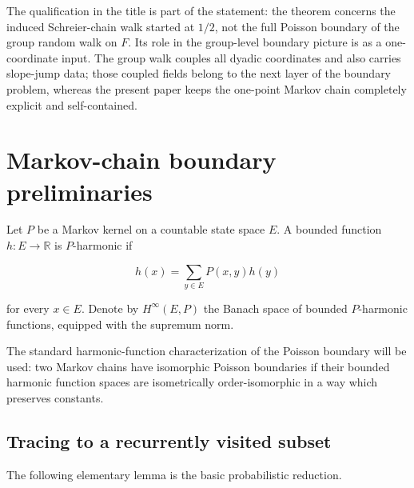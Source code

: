 \documentclass[11pt,a4paper]{scrartcl}
\begin{document}
The qualification in the title is part of the statement: the theorem concerns
the induced Schreier-chain walk started at \(1/2\), not the full Poisson
boundary of the group random walk on \(F\).  Its role in the group-level
boundary picture is as a one-coordinate input.  The group walk couples all
dyadic coordinates and also carries slope-jump data; those coupled fields
belong to the next layer of the boundary problem, whereas the present paper
keeps the one-point Markov chain completely explicit and self-contained.


\section{Markov-chain boundary preliminaries}\label{sec:markov-chain-boundary-preliminaries}


Let \(P\) be a Markov kernel on a countable state space \(E\). A bounded
function \(h:E\to\mathbb R\) is \(P\)-harmonic if

\[
h(x)=\sum_{y\in E}P(x,y)h(y)
\]

for every \(x\in E\). Denote by \(H^\infty(E,P)\) the Banach space of
bounded \(P\)-harmonic functions, equipped with the supremum norm.

The standard harmonic-function characterization of the Poisson boundary will
be used: two Markov chains have isomorphic Poisson boundaries if their
bounded harmonic function spaces are isometrically order-isomorphic in a way
which preserves constants.


\subsection{Tracing to a recurrently visited subset}\label{subsec:tracing-to-a-recurrently-visited-subset}


The following elementary lemma is the basic probabilistic reduction.
\end{document}

